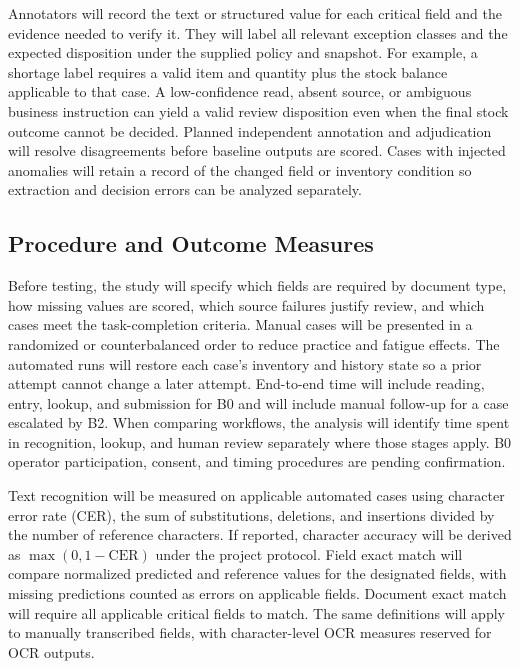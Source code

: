 \documentclass[conference]{IEEEtran}
\begin{document}
Annotators will record the text or structured value for each critical field and the evidence needed to verify it. They will label all relevant exception classes and the expected disposition under the supplied policy and snapshot. For example, a shortage label requires a valid item and quantity plus the stock balance applicable to that case. A low-confidence read, absent source, or ambiguous business instruction can yield a valid review disposition even when the final stock outcome cannot be decided. Planned independent annotation and adjudication will resolve disagreements before baseline outputs are scored. Cases with injected anomalies will retain a record of the changed field or inventory condition so extraction and decision errors can be analyzed separately.

\subsection{Procedure and Outcome Measures}
Before testing, the study will specify which fields are required by document type, how missing values are scored, which source failures justify review, and which cases meet the task-completion criteria. Manual cases will be presented in a randomized or counterbalanced order to reduce practice and fatigue effects. The automated runs will restore each case's inventory and history state so a prior attempt cannot change a later attempt. End-to-end time will include reading, entry, lookup, and submission for B0 and will include manual follow-up for a case escalated by B2. When comparing workflows, the analysis will identify time spent in recognition, lookup, and human review separately where those stages apply. B0 operator participation, consent, and timing procedures are pending confirmation.

Text recognition will be measured on applicable automated cases using character error rate (CER), the sum of substitutions, deletions, and insertions divided by the number of reference characters. If reported, character accuracy will be derived as \(\max(0,1-\mathrm{CER})\) under the project protocol. Field exact match will compare normalized predicted and reference values for the designated fields, with missing predictions counted as errors on applicable fields. Document exact match will require all applicable critical fields to match. The same definitions will apply to manually transcribed fields, with character-level OCR measures reserved for OCR outputs.
\end{document}
